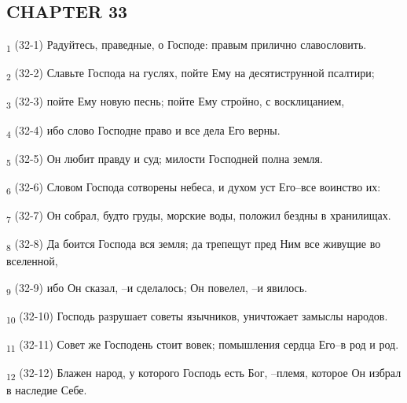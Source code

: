 \subsection{CHAPTER 33}
\begin{tcolorbox}
\textsubscript{1} (32-1) Радуйтесь, праведные, о Господе: правым прилично славословить.
\end{tcolorbox}
\begin{tcolorbox}
\textsubscript{2} (32-2) Славьте Господа на гуслях, пойте Ему на десятиструнной псалтири;
\end{tcolorbox}
\begin{tcolorbox}
\textsubscript{3} (32-3) пойте Ему новую песнь; пойте Ему стройно, с восклицанием,
\end{tcolorbox}
\begin{tcolorbox}
\textsubscript{4} (32-4) ибо слово Господне право и все дела Его верны.
\end{tcolorbox}
\begin{tcolorbox}
\textsubscript{5} (32-5) Он любит правду и суд; милости Господней полна земля.
\end{tcolorbox}
\begin{tcolorbox}
\textsubscript{6} (32-6) Словом Господа сотворены небеса, и духом уст Его--все воинство их:
\end{tcolorbox}
\begin{tcolorbox}
\textsubscript{7} (32-7) Он собрал, будто груды, морские воды, положил бездны в хранилищах.
\end{tcolorbox}
\begin{tcolorbox}
\textsubscript{8} (32-8) Да боится Господа вся земля; да трепещут пред Ним все живущие во вселенной,
\end{tcolorbox}
\begin{tcolorbox}
\textsubscript{9} (32-9) ибо Он сказал, --и сделалось; Он повелел, --и явилось.
\end{tcolorbox}
\begin{tcolorbox}
\textsubscript{10} (32-10) Господь разрушает советы язычников, уничтожает замыслы народов.
\end{tcolorbox}
\begin{tcolorbox}
\textsubscript{11} (32-11) Совет же Господень стоит вовек; помышления сердца Его--в род и род.
\end{tcolorbox}
\begin{tcolorbox}
\textsubscript{12} (32-12) Блажен народ, у которого Господь есть Бог, --племя, которое Он избрал в наследие Себе.
\end{tcolorbox}
